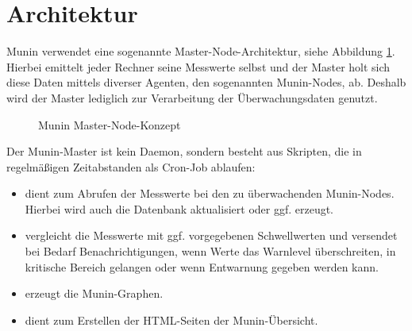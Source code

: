 \section{Architektur}

Munin verwendet eine sogenannte Master-Node-Architektur, siehe Abbildung \ref{master-munin}.
Hierbei emittelt jeder Rechner seine Messwerte selbst und der Master holt sich diese Daten mittels diverser Agenten, den sogenannten Munin-Nodes, ab.
Deshalb wird der Master lediglich zur Verarbeitung der Überwachungsdaten genutzt.

\begin{figure}[ht]
	\centering
		\caption[Munin Master-Node-Konzept]{Munin Master-Node-Konzept\protect\footnotemark}
		\label{master-munin}
\end{figure}

Der Munin-Master ist kein Daemon, sondern besteht aus Skripten, die in regelmäßigen Zeitabstanden als Cron-Job ablaufen:
\begin{itemize}
\item {} dient zum Abrufen der Messwerte bei den zu überwachenden Munin-Nodes. Hierbei wird auch die Datenbank aktualisiert oder ggf. erzeugt.
\item {} vergleicht die Messwerte mit ggf. vorgegebenen Schwellwerten und versendet bei Bedarf Benachrichtigungen, wenn Werte das Warnlevel überschreiten, in kritische Bereich gelangen oder wenn Entwarnung gegeben werden kann.
\item {} erzeugt die Munin-Graphen.
\item {} dient zum Erstellen der HTML-Seiten der Munin-Übersicht.
\end{itemize}


